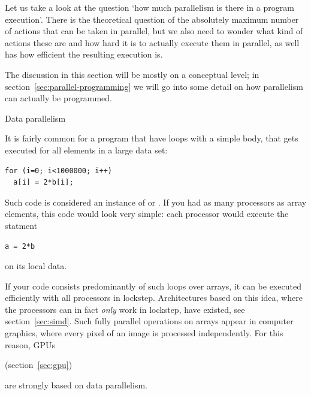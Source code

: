 
Let us take a look at the question `how much parallelism is there in a
program execution'. 
There is the theoretical question of the
absolutely maximum number of actions that can be taken in parallel,
but we also need to wonder what kind of actions these are and how hard
it is to actually execute them in parallel, as well has how efficient
the resulting execution is.

The discussion in this section will be mostly on a conceptual level;
in section~\ref{sec:parallel-programming} we will go into some detail
on how parallelism can actually be programmed.

 {Data parallelism}
\label{sec:data-parallel}

It is fairly common for a program that have loops with a simple body,
that gets executed for all elements in a large data set:
\begin{verbatim}
for (i=0; i<1000000; i++)
  a[i] = 2*b[i];
\end{verbatim}
Such code is considered an instance of
 or
. If you had as many
processors as array elements, this code would look very simple: each
processor would execute the statment
\begin{verbatim}
a = 2*b
\end{verbatim}
on its local data. 

If your code consists predominantly of such loops
over arrays, it can be executed efficiently with all processors in
lockstep. Architectures based on this idea, where the processors can
in fact \emph{only} work in lockstep, have existed, see
section~\ref{sec:simd}. Such fully parallel operations on arrays 
appear in computer graphics, where every pixel of an image is processed
independently. For this reason, \acp{GPU}
\begin{gpu}
  (section~\ref{sec:gpu})
\end{gpu}
are strongly based on data parallelism.

